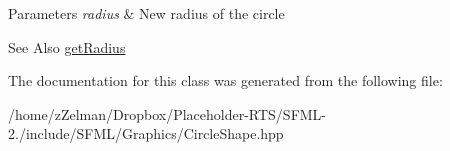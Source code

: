 \begin{DoxyParams}{Parameters}
{\em radius} & New radius of the circle\\
\hline
\end{DoxyParams}
\begin{DoxySeeAlso}{See Also}
\hyperlink{classsf_1_1CircleShape_afaf5175a75b6179cc177b1281027ab00}{get\-Radius} 
\end{DoxySeeAlso}


The documentation for this class was generated from the following file\-:\begin{DoxyCompactItemize}
\item 
/home/z\-Zelman/\-Dropbox/\-Placeholder-\/\-R\-T\-S/\-S\-F\-M\-L-\/2./include/\-S\-F\-M\-L/\-Graphics/Circle\-Shape.\-hpp\end{DoxyCompactItemize}
